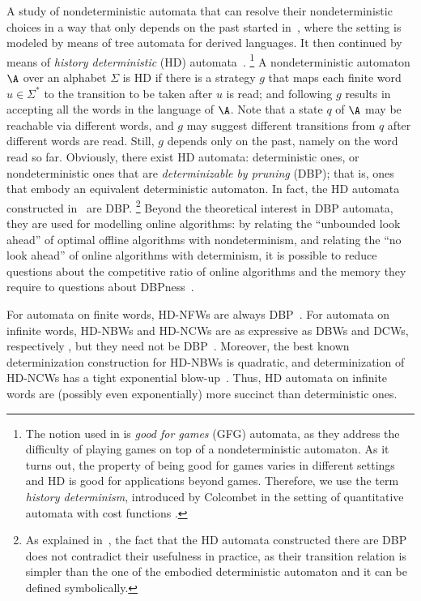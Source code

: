 \documentclass{lmcs}
\begin{document}
A study of nondeterministic automata that can resolve their nondeterministic choices in a way that only depends on the past started in~\cite{KSV06}, where the setting is modeled by means of tree automata for derived languages. It then continued by means of  {\em history deterministic\/}  (HD) automata~\cite{HP06}.
\footnote{The notion used in \cite{HP06} is {\em good for games} (GFG) automata, as they address the difficulty of playing games on top of a nondeterministic automaton. As it turns out, the property of being good for games varies in different settings and HD is good for applications beyond games. Therefore, we use the term {\em history determinism}, introduced by Colcombet in the setting of quantitative automata with cost functions \cite{Col09}.} 
A nondeterministic automaton $\A$ over an alphabet $\Sigma$ is HD if there is a strategy $g$ that maps each finite word $u \in \Sigma^*$ to the transition to be taken after $u$ is read; and following $g$ results in accepting all the words in the language of $\A$. Note that a state $q$ of $\A$ may be reachable via different words, and $g$ may suggest different transitions from $q$ after different words are read. Still, $g$ depends only on the past, namely on the word read so far. Obviously, there exist HD automata: deterministic ones, or nondeterministic ones that are {\em determinizable by pruning\/} (DBP); that is, ones that embody an equivalent deterministic automaton. In fact, the HD automata constructed in~\cite{HP06} are DBP.
\footnote{As explained in~\cite{HP06}, the fact that the HD automata constructed there are DBP does not contradict their usefulness in practice, as their transition relation is simpler than the one of the embodied deterministic automaton and it can be defined symbolically.} 
Beyond the theoretical interest in DBP automata, they are used for modelling online algorithms: by relating the ``unbounded look ahead''
of optimal offline algorithms with nondeterminism, and relating the ``no look ahead'' of online algorithms with
determinism, it is possible to reduce questions about the competitive ratio of online algorithms and the memory
they require to questions about DBPness~\cite{AKL10,AK15}. 
 
For automata on finite words, HD-NFWs are always DBP~\cite{KSV06,Mor03}. For automata on infinite words, HD-NBWs and HD-NCWs are as expressive as DBWs and DCWs, respectively \cite{KSV06,NW98}, but they need not be DBP~\cite{BKKS13}. 
Moreover, the best known determinization construction for HD-NBWs is quadratic, and determinization of HD-NCWs has a tight exponential blow-up~\cite{KS15}. Thus, HD automata on infinite words are (possibly even exponentially) more succinct than deterministic ones.
\end{document}
